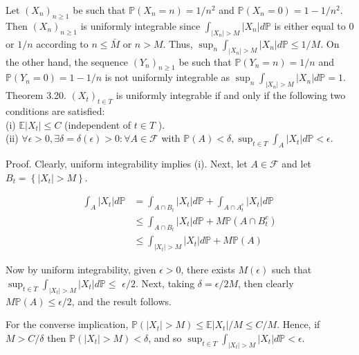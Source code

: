 \documentclass{amsbook}
\theoremstyle{plain}%
\theoremstyle{definition}
\theoremstyle{remark}
\begin{document}
Let $\left(X_{n}\right)_{n \geq 1}$ be such that $\mathbb{P}\left(X_{n}=n\right)=1 / n^{2}$ and $\mathbb{P}\left(X_{n}=0\right)=1-1 / n^{2}$. Then $\left(X_{n}\right)_{n \geq 1}$ is uniformly integrable since $\int_{\left|X_{n}\right|>M}\left|X_{n}\right| d \mathbb{P}$ is either equal to 0 or $1 / n$ according to $n \leq \bar{M}$ or $n>M$. Thus, $\sup _{n} \int_{\left|X_{n}\right|>M}\left|X_{n}\right| d \mathbb{P} \leq 1 / M$. On the other hand, the sequence $\left(Y_{n}\right)_{n \geq 1}$ be such that $\mathbb{P}\left(Y_{n}=n\right)=1 / n$ and $\mathbb{P}\left(Y_{n}=0\right)=1-1 / n$ is not uniformly integrable as $\sup _{n} \int_{\left|X_{n}\right|>M}\left|X_{n}\right| d \mathbb{P}=1$.\\
Theorem 3.20. $\left(X_{t}\right)_{t \in T}$ is uniformly integrable if and only if the following two conditions are satisfied:\\
(i) $\mathbb{E}\left|X_{t}\right| \leq C$ (independent of $t \in T$ ).\\
(ii) $\forall \epsilon>0, \exists \delta=\delta(\epsilon)>0: \forall A \in \mathcal{F}$ with $\mathbb{P}(A)<\delta, \sup _{t \in T} \int_{A}\left|X_{t}\right| d \mathbb{P}<\epsilon$.

Proof. Clearly, uniform integrability implies (i). Next, let $A \in \mathcal{F}$ and let $B_{t}=\left\{\left|X_{t}\right|>M\right\}$.

$$
\begin{aligned}
  \int_{A}\left|X_{t}\right| d \mathbb{P} & =\int_{A \cap B_{t}}\left|X_{t}\right| d \mathbb{P}+\int_{A \cap A_{t}^{c}}\left|X_{t}\right| d \mathbb{P} \\
  & \leq \int_{A \cap B_{t}}\left|X_{t}\right| d \mathbb{P}+M \mathbb{P}\left(A \cap B_{t}^{c}\right)          \\
  & \leq \int_{\left|X_{t}\right|>M}\left|X_{t}\right| d \mathbb{P}+M \mathbb{P}(A)
\end{aligned}
$$

Now by uniform integrability, given $\epsilon>0$, there exists $M(\epsilon)$ such that $\sup _{t \in T} \int_{\left|X_{t}\right|>M}\left|X_{t}\right| d \mathbb{P} \leq$ $\epsilon / 2$. Next, taking $\delta=\epsilon / 2 M$, then clearly $M \mathbb{P}(A) \leq \epsilon / 2$, and the result follows.

For the converse implication, $\mathbb{P}\left(\left|X_{t}\right|>M\right) \leq \mathbb{E}\left|X_{t}\right| / M \leq C / M$. Hence, if $M>C / \delta$ then $\mathbb{P}\left(\left|X_{t}\right|>M\right)<\delta$, and so $\sup _{t \in T} \int_{\left|X_{t}\right|>M}\left|X_{t}\right| d \mathbb{P}<\epsilon$.
\end{document}
